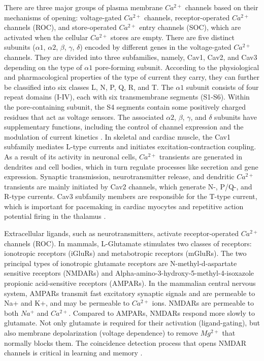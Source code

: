 There are three major groups of plasma membrane $Ca^{2+}$ channels based on their mechanisms of opening: voltage-gated $Ca^{2+}$ channels, receptor-operated $Ca^{2+}$ channels (ROC), and store-operated $Ca^{2+}$ entry channels (SOC), which are activated when the cellular $Ca^{2+}$ stores are empty. There are five distinct subunits ($\alpha 1$, $\alpha 2$, $\beta$, $\gamma$, $\delta$) encoded by different genes in the voltage-gated $Ca^{2+}$ channels. They are divided into three subfamilies, namely, Cav1, Cav2, and Cav3 depending on the type of $\alpha 1$ pore-forming subunit. According to the physiological and pharmacological properties of the type of current they carry, they can further be classified into six classes L, N, P, Q, R, and T. The $\alpha 1$ subunit consists of four repeat domains (I-IV), each with six transmembrane segments (S1-S6). Within the pore-containing subunit, the S4 segments contain some positively charged residues that act as voltage sensors. The associated $\alpha 2$, $\beta$, $\gamma$, and $\delta$ subunits have supplementary functions, including the control of channel expression and the modulation of current kinetics \parencite{Hofmann1999, Catterall2000}. In skeletal and cardiac muscle, the Cav1 subfamily mediates L-type currents and initiates excitation-contraction coupling. As a result of its activity in neuronal cells, $Ca^{2+}$ transients are generated in dendrites and cell bodies, which in turn regulate processes like secretion and gene expression. Synaptic transmission, neurotransmitter release, and dendritic $Ca^{2+}$ transients are mainly initiated by Cav2 channels, which generate N-, P/Q-, and R-type currents. Cav3 subfamily members are responsible for the T-type current, which is important for pacemaking in cardiac myocytes and repetitive action potential firing in the thalamus \parencite{Catterall2011}.

Extracellular ligands, such as neurotransmitters, activate receptor-operated $Ca^{2+}$ channels (ROC). In mammals, L-Glutamate stimulates two classes of receptors: ionotropic receptors (iGluRs) and metabotropic receptors (mGluRs). The two principal types of ionotropic glutamate receptors are N-methyl-d-aspartate sensitive receptors (NMDARs) and Alpha-amino-3-hydroxy-5-methyl-4-isoxazole propionic acid-sensitive receptors (AMPARs). In the mammalian central nervous system, AMPARs transmit fast excitatory synaptic signals and are permeable to Na+ and K+, and may be permeable to $Ca^{2+}$ ions. NMDARs are permeable to both $Na^{+}$ and $Ca^{2+}$. Compared to AMPARs, NMDARs respond more slowly to glutamate. Not only glutamate is required for their activation (ligand-gating), but also membrane depolarization (voltage dependence) to remove $Mg^{2+}$ that normally blocks them. The coincidence detection process that opens NMDAR channels is critical in learning and memory \parencite{Miyashita2012}.


